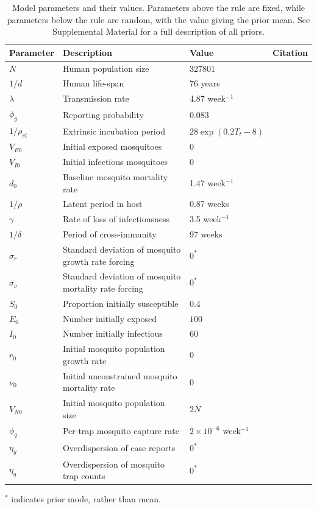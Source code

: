 \documentclass[10pt,letterpaper]{article}
\begin{document}
\begin{table}[!ht]
\label{parameters}
\begin{adjustwidth}{-2.25in}{0in} 
\begin{center}
\caption{Model parameters and their values.  Parameters above the rule are fixed, while parameters below the rule are random, with the value giving the prior mean. See Supplemental Material for a full description of all priors.}
\begin{tabular}{llll}
Parameter & Description & Value & Citation\\
\hline
$N$ & Human population size & 327801 & \cite{vitpop} \\
$1/d$ & Human life-span & 76 years & \cite{vitlong} \\
$\lambda$ & Transmission rate & 4.87 week$^{-1}$ & \cite{Scott2000}\\
$\phi_y$ & Reporting probability & 0.083 & \cite{Silva2016}\\
$1/\rho_{vt}$ & Extrinsic incubation period & $28\exp \left( 0.2 T_t - 8 \right)$ & \cite{Chan2012}\\
$V_{E0}$ & Initial exposed mosquitoes &  0 & \\
$V_{I0}$ & Initial infectious mosquitoes & 0 & \\
\hline
$d_0$ & Baseline mosquito mortality rate & 1.47 week$^{-1}$ & \cite{Brady2013} \\
$1/\rho$ & Latent period in host & 0.87 weeks  & \cite{Chan2012}\\
$\gamma$ & Rate of loss of infectiousness & 3.5 week$^{-1}$ & \cite{Nguyet2013}\\
$1/\delta$ & Period of cross-immunity & 97 weeks &  \cite{Reich2013}\\
$\sigma_r$ & Standard deviation of mosquito growth rate forcing & $0^*$ & \\
$\sigma_{\nu}$ & Standard deviation of mosquito mortality rate forcing & $0^*$ & \\
$S_0$ & Proportion initially susceptible & 0.4 & \cite{Cardoso2011a} \\
$E_0$ & Number initially exposed & $100$ & \\
$I_0$ & Number initially infectious & $60$ & \\
$r_0$ & Initial mosquito population growth rate & 0 & \\
$\nu_0$ & Initial unconstrained mosquito mortality rate & 0 & \\
$V_{N0}$ & Initial mosquito population size & $2N$ & \\
$\phi_q$ & Per-trap mosquito capture rate & $2 \times 10^{-6}$ week$^{-1}$ & \\
$\eta_y$ & Overdispersion of case reports & $0^*$ & \\
$\eta_q$ & Overdispersion of mosquito trap counts & $0^*$ & \\
\end{tabular}
\end{center}
\end{adjustwidth}
$^*$ indicates prior mode, rather than mean.
\end{table}
\end{document}
